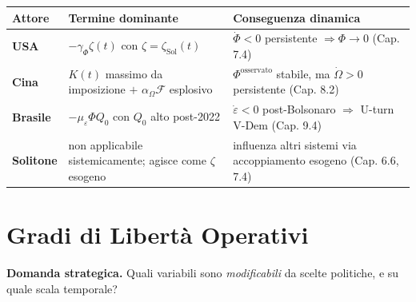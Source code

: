 {\def\LTcaptype{none} %
{\small\begin{longtable}[]{@{}
  >{\raggedright\arraybackslash}p{}
  >{\raggedright\arraybackslash}p{}
  >{\raggedright\arraybackslash}p{}@{}}
\toprule\noalign{}
\begin{minipage}[b]{\linewidth}\raggedright
Attore
\end{minipage} & \begin{minipage}[b]{\linewidth}\raggedright
Termine dominante
\end{minipage} & \begin{minipage}[b]{\linewidth}\raggedright
Conseguenza dinamica
\end{minipage} \\
\midrule\noalign{}
\endhead
\bottomrule\noalign{}
\endlastfoot
\textbf{USA} & \(-\gamma_\Phi \zeta(t)\) con
\(\zeta = \zeta_{\text{Sol}}(t)\) & \(\dot\Phi < 0\) persistente
\(\Rightarrow \Phi \to 0\) (Cap. 7.4) \\
\textbf{Cina} & \(K(t)\) massimo da imposizione \(+\)
\(\alpha_\Omega \mathcal{F}\) esplosivo & \(\Phi^{\text{osservato}}\)
stabile, ma \(\dot\Omega > 0\) persistente (Cap. 8.2) \\
\textbf{Brasile} & \(-\mu_\varepsilon \Phi Q_0\) con \(Q_0\) alto
post-2022 & \(\dot\varepsilon < 0\) post-Bolsonaro \(\Rightarrow\)
U-turn V-Dem (Cap. 9.4) \\
\textbf{Solitone} & non applicabile sistemicamente; agisce come
\(\zeta\) esogeno & influenza altri sistemi via accoppiamento esogeno
(Cap. 6.6, 7.4) \\
\end{longtable}}
}



\section{Gradi di Libertà
Operativi}\label{gradi-di-libertuxe0-operativi}

\Hypoth{} \textbf{Domanda strategica.} Quali variabili sono
\emph{modificabili} da scelte politiche, e su quale scala temporale?

